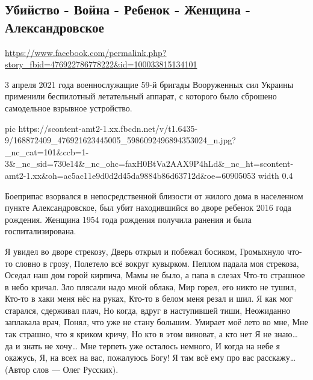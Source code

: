  
 
 
 
 

\subsection{Убийство - Война - Ребенок - Женщина - Александровское}
\url{https://www.facebook.com/permalink.php?story_fbid=476922786778222&id=100033815134101}

3 апреля 2021 года военнослужащие 59-й бригады Вооруженных сил Украины
применили беспилотный летательный аппарат, с которого было сброшено самодельное
взрывное устройство.


\ifcmt
  pic https://scontent-amt2-1.xx.fbcdn.net/v/t1.6435-9/168872409_476921623445005_5986092496894353024_n.jpg?_nc_cat=101&ccb=1-3&_nc_sid=730e14&_nc_ohc=faxH0BtVa2AAX9P4hLd&_nc_ht=scontent-amt2-1.xx&oh=ac5ac11e9d0d2d45da9884b86d63712d&oe=60905053
  width 0.4
\fi


Боеприпас взорвался в непосредственной близости от жилого дома в населенном
пункте Александровское, был убит находившийся во дворе ребенок 2016 года
рождения. Женщина 1954 года рождения получила ранения и была госпитализирована.

Я увидел во дворе стрекозу,
Дверь открыл и побежал босиком,
Громыхнуло что-то словно в грозу,
Полетело всё вокруг кувырком.
Пеплом падала моя стрекоза,
Оседал наш дом горой кирпича,
Мамы не было, а папа в слезах
Что-то страшное в небо кричал.
Зло плясали надо мной облака,
Мир горел, его никто не тушил,
Кто-то в хаки меня нёс на руках,
Кто-то в белом меня резал и шил.
Я как мог старался, сдерживал плач,
Но когда, вдруг в наступившей тиши,
Неожиданно заплакала врач,
Понял, что уже не стану большим.
Умирает моё лето во мне,
Мне так страшно, что я криком кричу,
Но кто в этом виноват, а кто нет
Я не знаю… да и знать не хочу…
Мне терпеть уже осталось немного,
И когда на небе я окажусь,
Я, на всех на вас, пожалуюсь Богу!
Я там всё ему про вас расскажу…
(Автор слов — Олег Русских).
